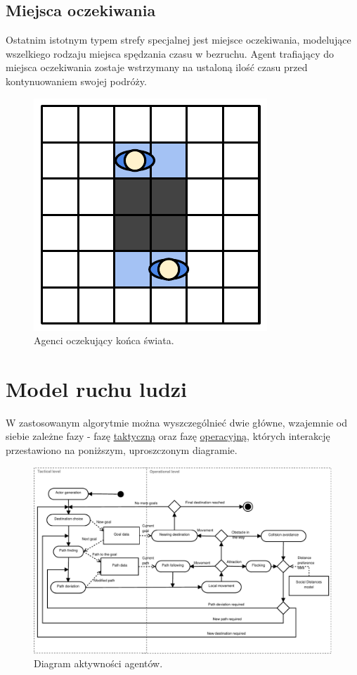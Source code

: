 \documentclass[a4paper, 12pt]{article}
\begin{document}
    \subsection{Miejsca oczekiwania}
    \label{sec:holders}

Ostatnim istotnym typem strefy specjalnej jest miejsce oczekiwania, modelujące wszelkiego rodzaju miejsca spędzania czasu w bezruchu. Agent trafiający do miejsca oczekiwania zostaje wstrzymany na ustaloną ilość czasu przed kontynuowaniem swojej podróży.

    \begin{figure}[H]
        \centering
        \includegraphics[scale=0.4]{./img/Held.pdf}
        \caption{Agenci oczekujący końca świata.}
        \label{fig:held-down}
    \end{figure}

\newpage
    \section{Model ruchu ludzi}
    \label{sec:move-model}

\noindent
W zastosowanym algorytmie można wyszczególnieć dwie główne, wzajemnie od siebie zależne fazy - fazę \hyperref[sec:tactical]{taktyczną} oraz fazę \hyperref[sec:operational]{operacyjną}, których interakcję przestawiono na poniższym, uproszczonym diagramie.

    \begin{figure}[H]
        \centering
        \includegraphics[scale=0.7]{./img/ActorActivity.pdf}
        \caption{Diagram aktywności agentów.}
        \label{fig:actor-activity}
    \end{figure}
\end{document}
